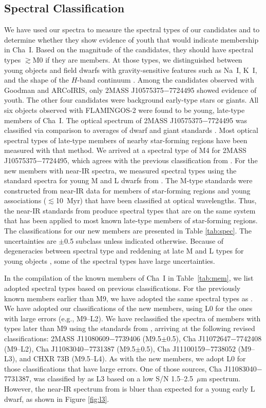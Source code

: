 \documentclass{emulateapj}
\begin{document}
\subsection{Spectral Classification}

We have used our spectra to measure the spectral types of our candidates and
to determine whether they show evidence of youth that would indicate membership
in Cha~I. Based on the magnitude of the candidates, they should have spectral
types $\gtrsim$M0 if they are members.
At those types, we distinguished between young objects and field dwarfs with
gravity-sensitive features such as Na~I, K~I, and the shape of the $H$-band
continuum \citep{mar96,luh97,luc01}.
Among the candidates observed with Goodman and ARCoIRIS, 
only 2MASS J10575375$-$7724495 showed evidence of youth.
The other four candidates were background early-type stars or giants. 
All six objects observed with FLAMINGOS-2 were found to be young, late-type
members of Cha~I.
The optical spectrum of 2MASS J10575375$-$7724495 was classified
via comparison to averages of dwarf and giant standards
\citep{luh97,luh98,luh99}.
Most optical spectral types of late-type members of nearby star-forming
regions have been measured with that method.
We arrived at a spectral type of M4 for 2MASS J10575375$-$7724495, which
agrees with the previous classification from \cite{fra15}.
For the new members with near-IR spectra, we measured spectral types
using the standard spectra for young M and L dwarfs from \cite{luh16b}.
The M-type standards were constructed from near-IR data for members of
star-forming regions and young associations ($\lesssim$10~Myr) that have
been classified at optical wavelengths. 
Thus, the near-IR standards from \cite{luh16b} produce spectral types that
are on the same system that has been applied to most known late-type members
of star-forming regions.
The classifications for our new members are presented in Table \ref{tab:spec}.
The uncertainties are $\pm$0.5 subclass unless indicated otherwise. 
Because of degeneracies between spectral type and reddening at late M and L types for young objects \citep{luh16b},
some of the spectral types have large uncertainties.

In the compilation of the known members of Cha~I in Table~\ref{tab:mem},
we list adopted spectral types based on previous classifications. 
For the previously known members earlier than M9, 
we have adopted the same spectral types as \cite{luhm08}.
We have adopted our classifications of the new members, 
using L0 for the ones with large errors (e.g., M9--L2).
We have reclassified the spectra of members with types later than
M9 \citep{luh06,luhm07} using the standards from \cite{luh16b},
arriving at the following revised classifications:
2MASS J11080609$-$7739406 (M9.5$\pm$0.5), 
Cha J11072647$-$7742408 (M9--L2), 
 Cha J11083040$-$7731387 (M9.5$\pm$0.5),
Cha J11100159$-$7738052 (M9--L3), and 
CHXR 73B (M9.5--L4).
As with the new members, we adopt L0 for those classifications that have
large errors. One of those sources, Cha J11083040$-$7731387, was
classified by \cite{muz15} as L3 based on a low S/N 1.5--2.5~$\mu$m spectrum. 
However, the near-IR spectrum from \citet{luhm07} is bluer than expected
for a young early L dwarf, as shown in Figure \ref{fig:l3}.
\end{document}
